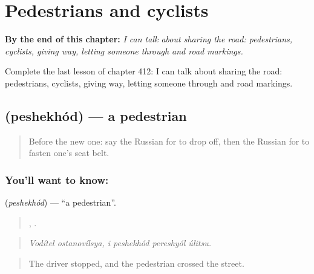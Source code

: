 
\chapter{Pedestrians and cyclists}
\label{ch:ru-pedestrians-and-cyclists}

\begin{chapteropening}
\textbf{By the end of this chapter:} \emph{I can talk about sharing the road: pedestrians, cyclists, giving way, letting someone through and road markings.}

Complete the last lesson of chapter 412: I can talk about sharing the road: pedestrians, cyclists, giving way, letting someone through and road markings.
\end{chapteropening}

\section[\texorpdfstring{\ru{пешеход} (peshekhód)}{пешеход (peshekhód)}]{ (peshekhód) — a pedestrian}

\label{lesson:RU-C412-peshekhod}



\begin{quote}
Before the new one: say the Russian for to drop off, then the Russian for to fasten one's seat belt.
\end{quote}

\subsection*{You'll want to know: }
\textbf{} (\emph{peshekhód}) — \textquotedblleft{}a pedestrian\textquotedblright{}.

\begin{quote}
 ,    .
\end{quote}

\begin{quote}
\emph{Vodítel ostanovílsya, i peshekhód pereshyól úlitsu.}
\end{quote}

\begin{quote}
The driver stopped, and the pedestrian crossed the street.
\end{quote}

